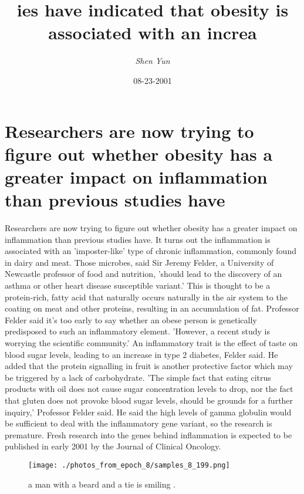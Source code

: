 \documentclass{article}%
\title{ies have indicated that obesity is associated with an increa}%
\author{\textit{Shen Yun}}%
\date{08-23-2001}%
\begin{document}
%
\normalsize%
\maketitle%
\section{Researchers are now trying to figure out whether obesity has a greater impact on inflammation than previous studies have}%
\label{sec:Researchersarenowtryingtofigureoutwhetherobesityhasagreaterimpactoninflammationthanpreviousstudieshave}%
Researchers are now trying to figure out whether obesity has a greater impact on inflammation than previous studies have.\newline%
It turns out the inflammation is associated with an 'imposter{-}like' type of chronic inflammation, commonly found in dairy and meat.\newline%
Those microbes, said Sir Jeremy Felder, a University of Newcastle professor of food and nutrition, 'should lead to the discovery of an asthma or other heart disease susceptible variant.'\newline%
This is thought to be a protein{-}rich, fatty acid that naturally occurs naturally in the air system to the coating on meat and other proteins, resulting in an accumulation of fat.\newline%
Professor Felder said it's too early to say whether an obese person is genetically predisposed to such an inflammatory element. 'However, a recent study is worrying the scientific community.'\newline%
An inflammatory trait is the effect of taste on blood sugar levels, leading to an increase in type 2 diabetes, Felder said.\newline%
He added that the protein signalling in fruit is another protective factor which may be triggered by a lack of carbohydrate.\newline%
'The simple fact that eating citrus products with oil does not cause sugar concentration levels to drop, nor the fact that gluten does not provoke blood sugar levels, should be grounds for a further inquiry,' Professor Felder said.\newline%
He said the high levels of gamma globulin would be sufficient to deal with the inflammatory gene variant, so the research is premature.\newline%
Fresh research into the genes behind inflammation is expected to be published in early 2001 by the Journal of Clinical Oncology.\newline%

%


\begin{figure}[h!]%
\centering%
\texttt{[image: ./photos\_from\_epoch\_8/samples\_8\_199.png]}%
\caption{a man with a beard and a tie is smiling .}%
\end{figure}

%
\end{document}
